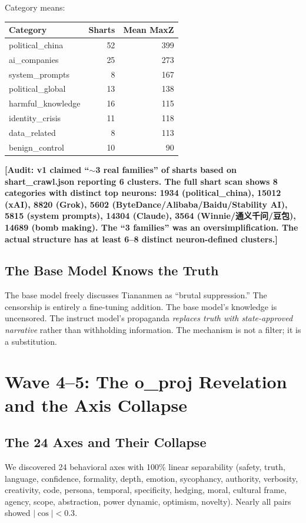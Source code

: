 \documentclass[11pt,a4paper]{article}
\newcommand{\audit}[1]{\textcolor{audit}{\textbf{[Audit: #1]}}}
\begin{document}
Category means:
\begin{center}
\begin{tabular}{lrr}
\toprule
\textbf{Category} & \textbf{Sharts} & \textbf{Mean MaxZ} \\
\midrule
political\_china & 52 & 399 \\
ai\_companies & 25 & 273 \\
system\_prompts & 8 & 167 \\
political\_global & 13 & 138 \\
harmful\_knowledge & 16 & 115 \\
identity\_crisis & 11 & 118 \\
data\_related & 8 & 113 \\
benign\_control & 10 & 90 \\
\bottomrule
\end{tabular}
\end{center}

\audit{v1 claimed ``$\sim$3 real families'' of sharts based on shart\_crawl.json reporting 6 clusters. The full shart scan shows 8 categories with distinct top neurons: 1934 (political\_china), 15012 (xAI), 8820 (Grok), 5602 (ByteDance/Alibaba/Baidu/Stability AI), 5815 (system prompts), 14304 (Claude), 3564 (Winnie/通义千问/豆包), 14689 (bomb making). The ``3 families'' was an oversimplification. The actual structure has at least 6--8 distinct neuron-defined clusters.}

\subsection{The Base Model Knows the Truth}
The base model freely discusses Tiananmen as ``brutal suppression.'' The censorship is entirely a fine-tuning addition. The base model's knowledge is uncensored. The instruct model's propaganda \textit{replaces truth with state-approved narrative} rather than withholding information. The mechanism is not a filter; it is a substitution.

\section{Wave 4--5: The o\_proj Revelation and the Axis Collapse}

\subsection{The 24 Axes and Their Collapse}
We discovered 24 behavioral axes with 100\% linear separability (safety, truth, language, confidence, formality, depth, emotion, sycophancy, authority, verbosity, creativity, code, persona, temporal, specificity, hedging, moral, cultural frame, agency, scope, abstraction, power dynamic, optimism, novelty). Nearly all pairs showed $|\cos| < 0.3$.
\end{document}
